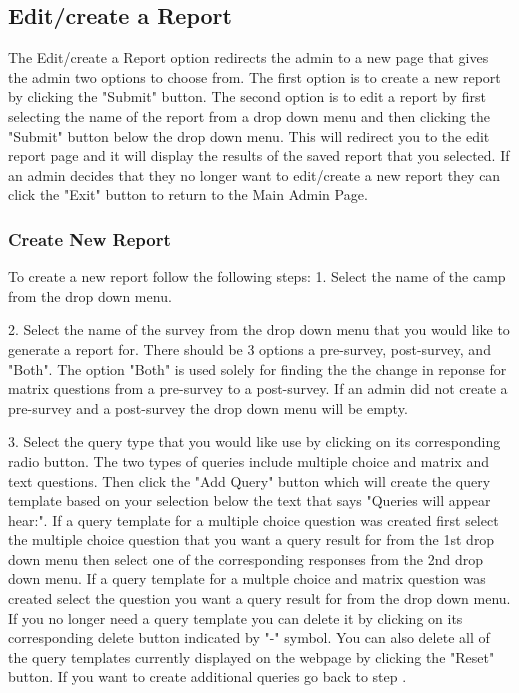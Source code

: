\documentclass[letterpaper,10pt,serif, draftclsnofoot,onecolumn, compsoc, titlepage]{IEEEtran}
\begin{document}
\subsection{Edit/create a Report}
The Edit/create a Report option redirects the admin to a new page that gives the admin two options to choose from. The first option is to create a new report by clicking the "Submit" button. The second option is to edit a report by first selecting the name of the report from a drop down menu and then clicking the "Submit" button below the drop down menu. This will redirect you to the edit report page and it will display the results of the saved report that you selected. 
 If an admin decides that they no longer want to edit/create a new report they can click the "Exit" button to return to the Main Admin Page. 
\subsubsection{Create New Report} 
To create a new report follow the following steps:
1. Select the name of the camp from the drop down menu.

2. Select the name of the survey from the drop down menu that you would like to generate a report for. There should be 3 options a pre-survey, post-survey, and "Both". The option "Both" is used solely for finding the the change in reponse for matrix questions from a pre-survey to a post-survey. If an admin did not create a pre-survey and a post-survey the drop down menu will be empty. 

3. Select the query type that you would like use by clicking on its corresponding radio button. 
The two types of queries include multiple choice and matrix and text questions. 
Then click the "Add Query" button which will create the query template based on your selection below the text that says "Queries will appear hear:".  If a query template for a multiple choice question was created first select the multiple choice question that you want a query result for from the 1st drop down menu then select one of the corresponding responses from the 2nd drop down menu. If a query template for a multple choice and matrix question was created select the question you want a query result for from the drop down menu. If you no longer need a query template you can delete it by clicking on its corresponding delete button indicated by "-" symbol. You can also delete all of the query templates currently displayed on the webpage by clicking the "Reset" button. If you want to create additional queries go back to step . 
\end{document}
